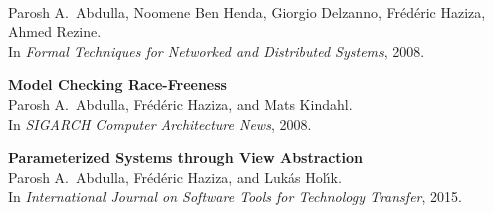 \begin{listofpapers}
    \\{\footnotesize Parosh A.\ Abdulla, Noomene Ben Henda, Giorgio Delzanno, Fr{\'{e}}d{\'{e}}ric Haziza, Ahmed Rezine}.
    \\In {\it Formal Techniques for Networked and Distributed Systems}, 2008.
  \item \label{paper:MCC08}%
    {\bf Model Checking Race-Freeness}
    \\{\footnotesize Parosh A.\ Abdulla, Fr{\'{e}}d{\'{e}}ric Haziza, and Mats Kindahl}.
    \\In {\it SIGARCH Computer Architecture News}, 2008.
  \item \label{paper:STTT15}%
    {\bf Parameterized Systems through View Abstraction}
    \\{\footnotesize Parosh A.\ Abdulla, Fr{\'{e}}d{\'{e}}ric Haziza, and Luk{\'{a}}s Hol{\'{\i}}k}.
    \\In {\it International Journal on Software Tools for Technology Transfer}, 2015.
\end{listofpapers}
